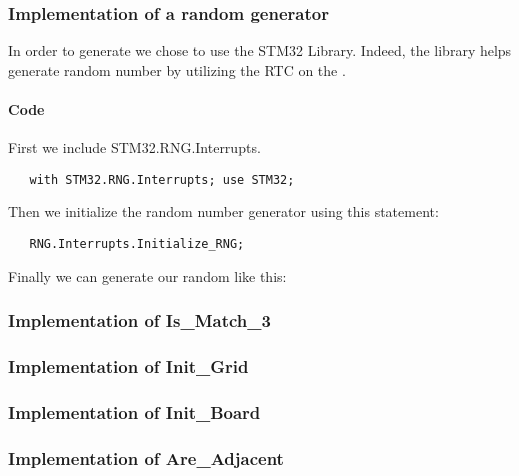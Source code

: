 \newpage

\subsubsection{Implementation of a random \sq generator}

In order to generate \sqs we chose to use the STM32 Library.
Indeed, the library helps generate random number by utilizing the RTC on the \stmdb.

\paragraph{Code}

\noindent
First we include STM32.RNG.Interrupts.
\begin{lstlisting}
   with STM32.RNG.Interrupts; use STM32;
\end{lstlisting}


\noindent
Then we initialize the random number generator using this statement:
\begin{lstlisting}
   RNG.Interrupts.Initialize_RNG;
\end{lstlisting}


\noindent
Finally we can generate our random \sqs like this:


\subsubsection{Implementation of Is\_Match\_3}


\newpage

\subsubsection{Implementation of Init\_Grid}


\subsubsection{Implementation of Init\_Board}


\newpage

\subsubsection{Implementation of Are\_Adjacent}


